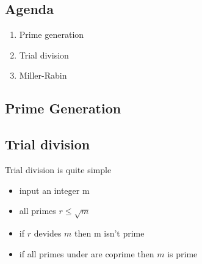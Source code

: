 

\subsection*{Agenda}
\begin{enumerate}
\item Prime generation
\item Trial division
\item Miller-Rabin
\end{enumerate}

\subsection{Prime Generation}
\subsection{Trial division}
Trial division is quite simple
\begin{itemize}
\item input an integer m
\item all primes $r\le \sqrt{m}$
\item if $r$ devides $m$ then m isn't prime
\item if all primes under are coprime then $m$ is prime
\end{itemize}

